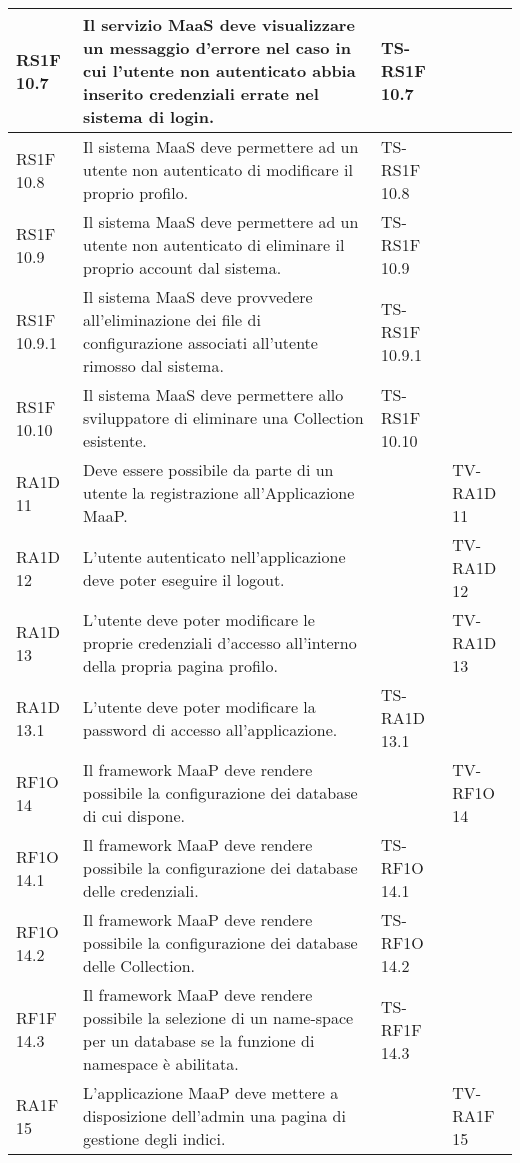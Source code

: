 \begin{center}
\begin{longtable}{| p{2cm} | p{6cm} | p{2.5cm} | p{2.5cm} | }
				RS1F 10.7 & 
				Il servizio MaaS deve visualizzare un messaggio d’errore nel caso in cui l’utente non autenticato abbia inserito credenziali errate nel sistema di login. & TS-RS1F 10.7 & \\ \hline 
				RS1F 10.8 & 
				Il sistema MaaS deve permettere ad un utente non autenticato di modificare il proprio profilo. & TS-RS1F 10.8 & \\ \hline 
				RS1F 10.9 & 
				Il sistema MaaS deve permettere ad un utente non autenticato di eliminare il proprio account dal sistema. & TS-RS1F 10.9 & \\ \hline 
				RS1F 10.9.1 & 
				Il sistema MaaS deve provvedere all’eliminazione dei file di configurazione associati all’utente rimosso dal sistema. & TS-RS1F 10.9.1 & \\ \hline 
				RS1F 10.10 & 
				Il sistema MaaS deve permettere allo sviluppatore di eliminare una Collection esistente. & TS-RS1F 10.10 & \\ \hline 
				RA1D 11 & 
				Deve essere possibile da parte di un utente la registrazione all’Applicazione MaaP. &  & TV-RA1D 11 \\ \hline 
				RA1D 12 & 
				L’utente autenticato nell’applicazione deve poter eseguire il logout. &  & TV-RA1D 12 \\ \hline 
				RA1D 13 & 
				L'utente deve poter modificare le proprie credenziali d'accesso all'interno della propria pagina profilo. &  & TV-RA1D 13 \\ \hline 
				RA1D 13.1 & 
				L’utente deve poter modificare la password di accesso all’applicazione. & TS-RA1D 13.1 & \\ \hline 
				RF1O 14 & 
				Il framework MaaP deve rendere possibile la configurazione dei database di cui dispone. &  & TV-RF1O 14 \\ \hline 
				RF1O 14.1 & 
				Il framework MaaP deve rendere possibile la configurazione dei database delle credenziali. & TS-RF1O 14.1 & \\ \hline 
				RF1O 14.2 & 
				Il framework MaaP deve rendere possibile la configurazione dei database delle Collection. & TS-RF1O 14.2 & \\ \hline 
				RF1F 14.3 & 
				Il framework MaaP deve rendere possibile la selezione di un name-space per un database se la funzione di namespace è abilitata. & TS-RF1F 14.3 & \\ \hline 
				RA1F 15 & 
				L’applicazione MaaP deve mettere a disposizione dell’admin una pagina di gestione degli indici. &  & TV-RA1F 15 \\ \hline 

\end{longtable}
\end{center}
